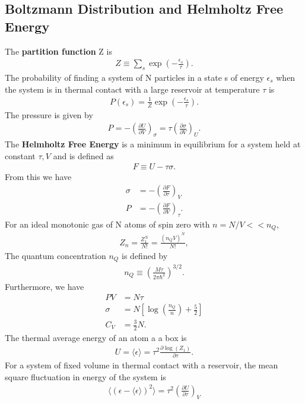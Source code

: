 \begin{multicols}{2}
	\section{Boltzmann Distribution and Helmholtz Free Energy}
	The \textbf{partition function} Z is
	\begin{align}
		Z \equiv \sum_{s} \exp\left(-\frac{\epsilon_s}{\tau}\right).
	\end{align}
	The probability of finding a system of N particles in a state s of energy $\epsilon_s$ when the system is in thermal contact with a large reservoir at temperature $\tau$ is
	\begin{align}
		P(\epsilon_s) = \frac{1}{Z}\exp\left(-\frac{\epsilon_s}{\tau}\right).
	\end{align} 
	The pressure is given by
	\begin{align}
		P = -\left(\frac{\partial U}{\partial V}\right)_\sigma = \tau\left(\frac{\partial \sigma}{\partial V}\right)_U.
	\end{align}
	The \textbf{Helmholtz Free Energy} is a minimum in equilibrium for a system held at constant $\tau, V$ and is defined as
	\begin{align}
		F\equiv U-\tau \sigma.	
	\end{align}
	From this we have
	\begin{align}
		\sigma &= -\left(\frac{\partial F}{\partial \tau}\right)_V \\
		P &= -\left(\frac{\partial F}{\partial V}\right)_\tau.
	\end{align}
	For an ideal monotonic gas of N atoms of spin zero with $n=N/V << n_Q$,
	\begin{align}
		Z_n = \frac{Z_1^N}{N!}=\frac{(n_Q V)^N}{N!},
	\end{align}
	The quantum concentration $n_Q$ is defined by
	\begin{align}
		n_Q \equiv \left(\frac{M\tau}{2\pi\hbar^2}\right)^{3/2}.
	\end{align}
	Furthermore, we have
	\begin{align}
		PV&=N\tau \\
		\sigma &=N\left[\log\left(\frac{n_Q}{n}\right)+\frac{5}{2}\right] \\
		C_V&=\frac{3}{2}N.  
	\end{align}
	The thermal average energy of an atom a a box is
	\begin{align}
		U = \langle \epsilon \rangle = \tau^2 \frac{\partial \log (Z_1)}{\partial \tau}.
	\end{align}
	For a system of fixed volume in thermal contact with a reservoir, the mean square fluctuation in energy of the system is
	\begin{align}
		\langle(\epsilon - 	\langle\epsilon \rangle)^2 \rangle = \tau^2\left(\frac{\partial U}{\partial \tau}\right)_V
	\end{align}  

\end{multicols}
